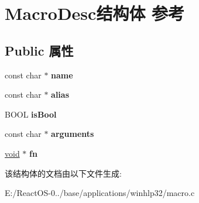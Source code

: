 \hypertarget{struct_macro_desc}{}\section{Macro\+Desc结构体 参考}
\label{struct_macro_desc}
\subsection*{Public 属性}
\begin{DoxyCompactItemize}
\item 
\mbox{\label{struct_macro_desc_ad0837f97945853261b88cab1ca45bbd3}} 
const char $\ast$ {\bfseries name}
\item 
\mbox{\label{struct_macro_desc_a02949f503b341348ec302aaf466c295f}} 
const char $\ast$ {\bfseries alias}
\item 
\mbox{\label{struct_macro_desc_aefcc94e9ec1de7d6d7ace9b4aaa81e82}} 
B\+O\+OL {\bfseries is\+Bool}
\item 
\mbox{\label{struct_macro_desc_a253debe51085af14836fe08e0db0a0bb}} 
const char $\ast$ {\bfseries arguments}
\item 
\mbox{\label{struct_macro_desc_a44850b465c4377484b1951224a1c7dc9}} 
\hyperlink{interfacevoid}{void} $\ast$ {\bfseries fn}
\end{DoxyCompactItemize}


该结构体的文档由以下文件生成\+:\begin{DoxyCompactItemize}
\item 
E\+:/\+React\+O\+S-\/0../base/applications/winhlp32/macro.\+c\end{DoxyCompactItemize}

